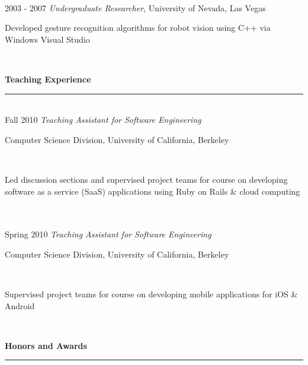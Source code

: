 \documentclass[11pt]{article}
\newcommand{\parwidth}{5.3 in}
\newcommand{\tabwidth}{1.5 in}
\newcommand{\head}[1]{
{\bf #1} \\
\rule{\textwidth}{0.01 in}

\vspace{-0.35 in}

}
\begin{document}
\begin{tabbing}
\hspace{\tabwidth} \= \\ 
2003 - 2007 \> \emph{Undergraduate Researcher}, University of Nevada, Las Vegas \\ 
\> \parbox[t]{\parwidth}{
\begin{compactitem}
\item Developed gesture recognition algorithms for robot vision using C++ via Windows Visual Studio
\end{compactitem}
}\\

\end{tabbing}
\head{Teaching Experience}

\begin{tabbing}
\hspace{\tabwidth} \= \\

Fall 2010 \> \emph{Teaching Assistant for Software Engineering}\\
\> \parbox[t]{\parwidth}{Computer Science Division, University of California, Berkeley} \\ 
\> \parbox[t]{\parwidth}{Led discussion sections and supervised project teams for course on developing software as a service (SaaS) applications using Ruby on Rails \& cloud computing} \\ \\

Spring 2010 \> \emph{Teaching Assistant for Software Engineering} \\
\> \parbox[t]{\parwidth}{Computer Science Division, University of California, Berkeley} \\ 
\> \parbox[t]{\parwidth}{Supervised project teams for course on developing mobile applications for iOS \& Android} \\ 

\end{tabbing}


\head{Honors and Awards}
\end{document}
